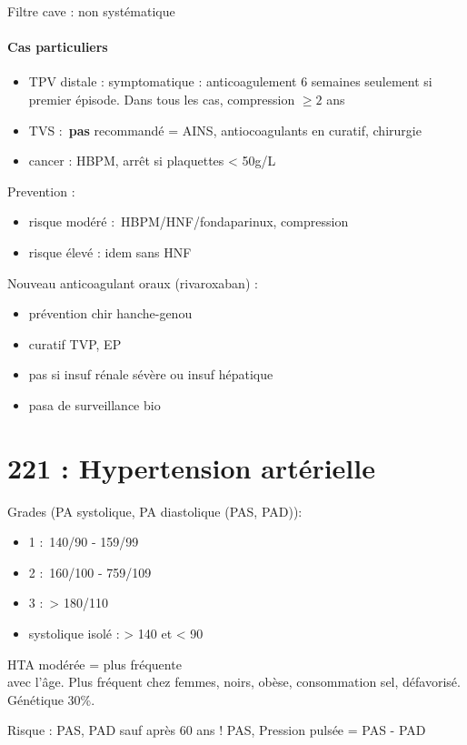 \documentclass{article}
\begin{document}
Filtre cave : non systématique

\paragraph{Cas particuliers}
\begin{itemize}
  \item 
TPV distale : symptomatique : anticoagulement 6 semaines seulement si premier épisode. Dans tous les cas,
compression $\ge 2$ ans
\item TVS : \textbf{pas} recommandé = AINS, antiocoagulants en curatif, chirurgie
\item cancer : HBPM, arrêt si plaquettes < 50g/L
\end{itemize}
Prevention : 
\begin{itemize}
  \item risque modéré : HBPM/HNF/fondaparinux, compression
  \item risque élevé : idem sans HNF
\end{itemize}

Nouveau anticoagulant oraux (rivaroxaban) :
\begin{itemize}
  \item prévention chir hanche-genou
  \item curatif TVP, EP
  \item pas si insuf rénale sévère ou insuf hépatique
  \item pasa de surveillance bio
\end{itemize}

\section{221 : Hypertension artérielle}%
\label{sec:221_hypertension_arterielle}
Grades (PA systolique, PA diastolique (PAS, PAD)):
\begin{itemize}
  \item 1 : 140/90 - 159/99
  \item 2 : 160/100 - 759/109
  \item 3 : > 180/110
  \item systolique isolé : > 140 et < 90
\end{itemize}

HTA modérée = plus fréquente\\
\inc avec l'âge. Plus fréquent chez femmes, noirs, obèse, consommation sel,
défavorisé. Génétique 30\%.

Risque : PAS, PAD sauf après 60 ans ! PAS, Pression pulsée = PAS - PAD
\end{document}
